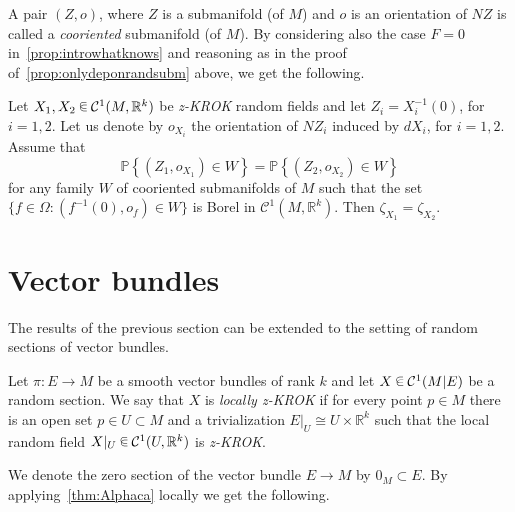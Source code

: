 \documentclass[AHL, Unicode, longabstracts, published]{cedram}
\newcommand{\R}{\mathbb{R}}
\newcommand{\PP}{\mathbb{P}}
\newcommand{\mC}{\mathcal{C}}
\newcommand{\zkrok}{\emph{z-KROK}\xspace}
\newcommand*\randin{
\mathchoice {\raisebox{-.35ex}{$\displaystyle{^\subset}$}\mkern-11.5mu\raisebox{+.45ex}{$\displaystyle{_\subset}$}} {\mkern+1mu\raisebox{-.27ex}{$\textstyle{^\subset}$}\mkern-11.7mu\raisebox{+.45ex}{$\textstyle{_\subset}$}} {\raisebox{.35ex}{$\scriptstyle\subset$}\mkern-14mu\raisebox{-.15ex}{$\scriptstyle\subset$}} {\raisebox{.3ex}{$\scriptscriptstyle\subset$}\mkern-13.5mu\raisebox{-.10ex}{$\scriptscriptstyle\subset$}}}
\begin{document}
A pair $(Z,o)$, where $Z$ is a submanifold (of $M$) and $o$ is an orientation of $NZ$ is called a \emph{cooriented} submanifold (of $M$). By considering also the case $F=0$ in~\cref{prop:introwhatknows} and reasoning as in the proof of~\cref{prop:onlydeponrandsubm} above, we get the following.

\begin{prop}\label{prop:onlydeponrandsubm2}
Let $X_1,X_2\,\randin\,\mC^1(M,\R^k)$ be \zkrok random fields and let $Z_i=X_i^{-1}(0)$, for $i=1,2.$ Let us denote by $o_{X_i}$ the orientation of $NZ_i$ induced by $dX_i$, for $i=1,2.$ Assume that
\begin{equation}\label{eq:P1ZZA2}
\PP\left\{ (Z_1,o_{X_1})\in W\right\}=\PP\left\{ (Z_2,o_{X_2})\in W\right\}
\end{equation}
for any family $W$ of cooriented submanifolds of $M$ such that the set $\{ f\in\Omega:(f^{-1}(0),o_f)\in W\}$ is Borel in $\mC^1(M,\R^k)$. Then $\zeta_{X_1}=\zeta_{X_2}$.
\end{prop}



\section{Vector bundles}\label{sec:vectbun}

The results of the previous section can be extended to the setting of random sections of vector bundles.

\begin{defi}\label{de:loczkrok}
Let $\pi:E\to M$ be a smooth vector bundles of rank $k$ and let $X\,\randin\, \mC^1(M|E)$ be a random section. We say that $X$ is \emph{locally \zkrok} if for every point $p\in M$ there is an open set $p\in U\subset M$ and a trivialization $E|_U\cong U\times \R^k$ such that the local random field $X|_U\,\randin\, \mC^1(U,\R^k)$ is \zkrok.
\end{defi}

We denote the zero section of the vector bundle $E\to M$ by $0_M\subset E$. By applying~\cref{thm:Alphaca} locally we get the following.
\end{document}
